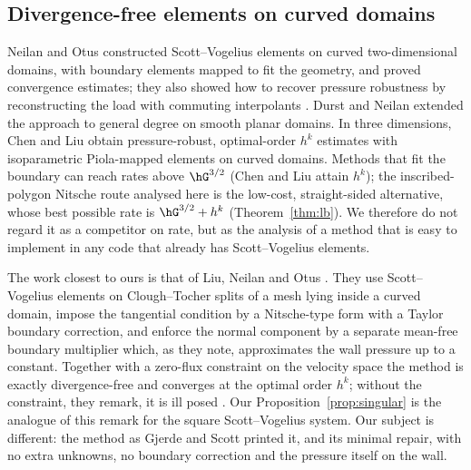 \subsection{Divergence-free elements on curved domains}
Neilan and Otus \cite{NeilanOtus2021} constructed Scott--Vogelius elements on curved two-dimensional domains, with boundary elements mapped to fit the geometry, and proved convergence estimates; they also showed how to recover pressure robustness by reconstructing the load with commuting interpolants \cite[Theorem~6.1]{NeilanOtus2021}. Durst and Neilan \cite{DurstNeilan2024} extended the approach to general degree on smooth planar domains. In three dimensions, Chen and Liu \cite{ChenLiu2026} obtain pressure-robust, optimal-order $h^k$ estimates with isoparametric Piola-mapped elements on curved domains. Methods that fit the boundary can reach rates above $\hG^{3/2}$ (Chen and Liu attain $h^k$); the inscribed-polygon Nitsche route analysed here is the low-cost, straight-sided alternative, whose best possible rate is $\hG^{3/2}+h^k$ (Theorem~\ref{thm:lb}). We therefore do not regard it as a competitor on rate, but as the analysis of a method that is easy to implement in any code that already has Scott--Vogelius elements.

The work closest to ours is that of Liu, Neilan and Otus \cite{LiuNeilanOtus2023}. They use Scott--Vogelius elements on Clough--Tocher splits of a mesh lying inside a curved domain, impose the tangential condition by a Nitsche-type form with a Taylor boundary correction, and enforce the normal component by a separate mean-free boundary multiplier which, as they note, approximates the wall pressure up to a constant. Together with a zero-flux constraint on the velocity space the method is exactly divergence-free and converges at the optimal order $h^k$; without the constraint, they remark, it is ill posed \cite[Remark~3.2]{LiuNeilanOtus2023}. Our Proposition~\ref{prop:singular} is the analogue of this remark for the square Scott--Vogelius system. Our subject is different: the method as Gjerde and Scott printed it, and its minimal repair, with no extra unknowns, no boundary correction and the pressure itself on the wall.

